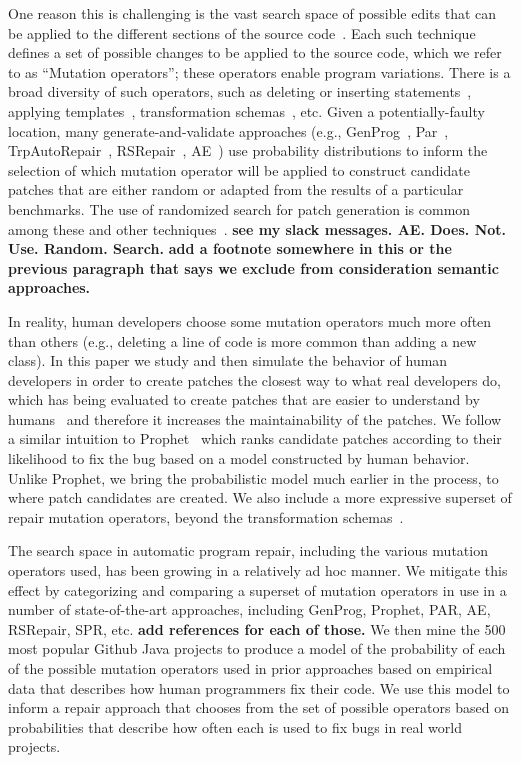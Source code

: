 \documentclass[conference]{IEEEtran}
\newcommand{\todo}[1]
  {{\scriptsize \textbf{\color{red} {#1}}}}
\begin{document}
One reason this is challenging is the vast search space of possible 
edits that can be applied to the different sections of the source 
code~\cite{long16}. Each such technique defines  a set of possible changes to be
applied to the source code, which we refer to as ``Mutation operators''; these operators enable program variations.
There is a broad diversity of such operators, such as deleting or inserting statements~\cite{legoues12}, applying templates~\cite{kim2013}, transformation schemas~\cite{fan15}, etc.
Given a potentially-faulty location, many
generate-and-validate approaches (e.g., GenProg~\cite{legoues12}, 
Par~\cite{kim2013}, TrpAutoRepair~\cite{Qi13}, RSRepair~\cite{Qi14},
AE~\cite{Weimer13}) use probability distributions to inform the selection of which mutation operator
will be applied to construct candidate patches that are either random or adapted
from the results of a particular benchmarks. The use of randomized search for patch generation is common among these and other techniques~\cite{arcuri08,bradbury10,Qi14,Weimer13}. \todo{see my slack messages.  AE.  Does.  Not.  Use.  Random.  Search.}
\todo{add a footnote somewhere in this or the previous paragraph that says we exclude from consideration semantic approaches.}

In reality, human developers choose some mutation operators 
much more often than 
others (e.g., deleting a line of code is more common
than adding a new class). In this paper we study and then simulate the behavior of human developers in order 
to create patches the closest way to what real developers do, which has 
being evaluated to create patches that are easier to understand by
humans~\cite{kim2013} and 
therefore it increases the maintainability of the patches. We follow a similar
intuition to Prophet~\cite{long15} which ranks candidate patches
according to their likelihood to fix the bug based on a model constructed by
human behavior. Unlike Prophet, we bring the
probabilistic model much earlier in the process, to where
patch candidates are created. We also include a more expressive superset of repair mutation
operators, beyond the transformation schemas~\cite{fan15}.  

The search space in automatic program repair, including the various mutation
operators used, has been growing in a relatively ad hoc 
manner. We mitigate this effect by categorizing and comparing a superset of
mutation operators in use in a number of 
state-of-the-art approaches, including GenProg, Prophet, PAR, AE, RSRepair,
SPR, etc. \todo{add references for each of those.}
We then mine
the 500 most popular Github Java projects to produce a model of the probability of
each of the possible mutation operators used in prior approaches based on 
empirical data that describes how human programmers fix their code.  We use this
model to inform a repair approach that chooses from the set of possible
operators based on 
probabilities that describe how often each is used
to fix bugs in real world projects. 
\end{document}
